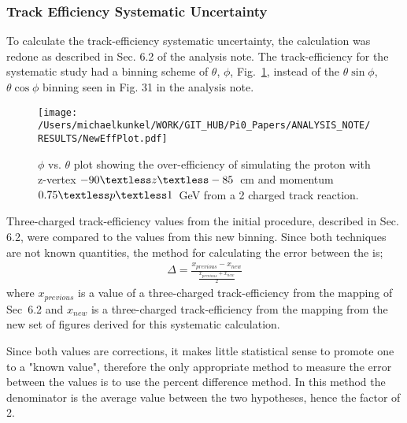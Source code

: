 \subsubsection{Track Efficiency Systematic Uncertainty}\label{sec:trkeffuncert}
 
	To calculate the track-efficiency systematic uncertainty, the calculation was redone as described in Sec. 6.2 of the analysis note. The track-efficiency for the systematic study had a binning scheme of $\theta$, $\phi$, Fig.~\ref{fig:toteff_protnew}, instead of the $\theta \sin\phi$, $\theta \cos\phi$ binning seen in Fig. 31 in the analysis note.
	
	\begin{figure}[h!]\begin{center}
			\texttt{[image: /Users/michaelkunkel/WORK/GIT\_HUB/Pi0\_Papers/ANALYSIS\_NOTE/RESULTS/NewEffPlot.pdf]}
			\caption[$\phi$ vs. $\theta$ plot showing the over-efficiency of simulating the proton with z-vertex $-90\textless z\textless-85$~cm and momentum $0.75\textless p \textless 1$~GeV from a 2 charged track reaction]{\label{fig:toteff_protnew} $\phi$ vs. $\theta$ plot showing the over-efficiency of simulating the proton with z-vertex $-90\textless z\textless-85$~cm and momentum $0.75\textless p \textless 1$~GeV from a 2 charged track reaction.}
		\end{center}\end{figure}
		
		Three-charged track-efficiency values from the initial procedure, described in Sec. 6.2, were compared to the values from this new binning. Since both techniques are not known quantities, the method for calculating the error between the is;
		\begin{align}
		\Delta = \frac{x_{previous} -x_{new} }{\frac{x_{previous} +x_{new}}{2}} \label{eq:eq1}
		\end{align}	
		where $x_{previous}$ is a value of a three-charged track-efficiency from the mapping of Sec~6.2 and $x_{new}$ is a three-charged track-efficiency from the mapping from the new set of figures derived for this systematic calculation.
		
		Since both values are corrections, it makes little statistical sense to promote one to a "known value", therefore the only appropriate method to measure the error between the values is to use the percent difference method. In this method the denominator is the average value between the two hypotheses, hence the factor of 2.
